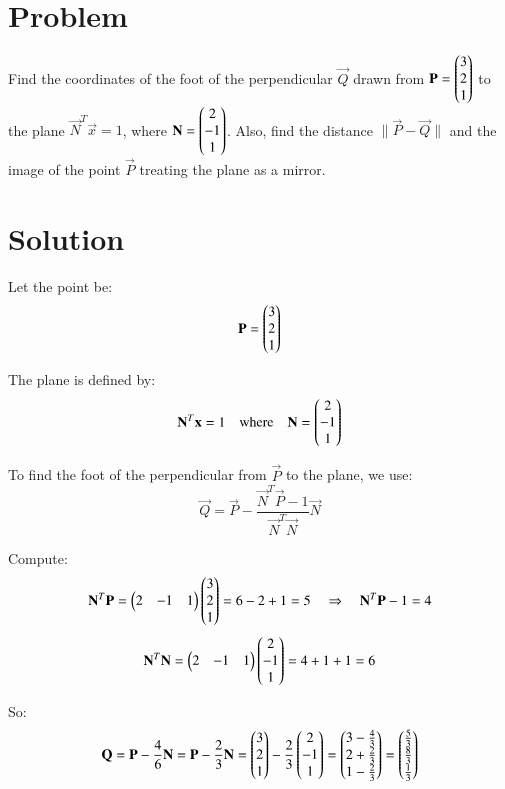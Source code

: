 \documentclass[journal]{IEEEtran}
\begin{document}

\vspace{3cm}

\section*{\large\textbf{Problem}}

Find the coordinates of the foot of the perpendicular \( \vec{Q} \) drawn from \( \mathbf{P} = \begin{pmatrix}3 \\ 2 \\ 1\end{pmatrix} \) to the plane \( \vec{N}^T \vec{x} = 1 \), where \( \mathbf{N} = \begin{pmatrix}2 \\ -1 \\ 1\end{pmatrix} \). Also, find the distance \( \|\vec{P} - \vec{Q}\| \) and the image of the point \( \vec{P} \) treating the plane as a mirror.

\section*{\large\textbf{Solution}}

Let the point be:
\[
\mathbf{P} = \begin{pmatrix}3 \\ 2 \\ 1\end{pmatrix}
\]

The plane is defined by:
\[
\mathbf{N}^T \mathbf{x} = 1
\quad \text{where} \quad
\mathbf{N} = \begin{pmatrix}2 \\ -1 \\ 1\end{pmatrix}
\]

To find the foot of the perpendicular from \( \vec{P} \) to the plane, we use:
\[
\vec{Q} = \vec{P} - \frac{\vec{N}^T \vec{P} - 1}{\vec{N}^T \vec{N}} \vec{N}
\]

Compute:
\[
\mathbf{N}^T \mathbf{P} = \begin{pmatrix}2 & -1 & 1\end{pmatrix} \begin{pmatrix}3 \\ 2 \\ 1\end{pmatrix} = 6 - 2 + 1 = 5
\quad \Rightarrow \quad
\mathbf{N}^T \mathbf{P} - 1 = 4
\]
\[
\mathbf{N}^T \mathbf{N} = \begin{pmatrix}2 & -1 & 1\end{pmatrix} \begin{pmatrix}2 \\ -1 \\ 1\end{pmatrix} = 4 + 1 + 1 = 6
\]

So:
\[
\mathbf{Q} = \mathbf{P} - \frac{4}{6} \mathbf{N}
= \mathbf{P} - \frac{2}{3} \mathbf{N}
= \begin{pmatrix}3 \\ 2 \\ 1\end{pmatrix} - \frac{2}{3} \begin{pmatrix}2 \\ -1 \\ 1\end{pmatrix}
= \begin{pmatrix}3 - \frac{4}{3} \\ 2 + \frac{2}{3} \\ 1 - \frac{2}{3}\end{pmatrix}
= \begin{pmatrix}\frac{5}{3} \\ \frac{8}{3} \\ \frac{1}{3}\end{pmatrix}
\]
\end{document}
